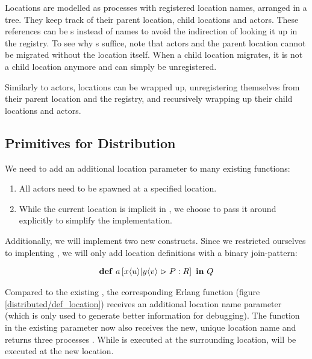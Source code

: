 Locations are modelled as processes with registered location names,
arranged in a tree.
They keep track of their parent location, child locations and actors.
These references can be \PID{}s instead of names
to avoid the indirection of looking it up in the registry.
To see why \PID{}s suffice, note that actors and the parent location
cannot be migrated without the location itself.
When a child location migrates, it is not a child location anymore and can
simply be unregistered.

Similarly to actors, locations can be wrapped up,
unregistering themselves from their parent location and the registry,
and recursively wrapping up their child locations and actors.



\subsection{Primitives for Distribution}

We need to add an additional location parameter to many existing functions:
\begin{enumerate}[nosep]
  \item
    All actors need to be spawned at a specified location.
  \item
    While the current location is implicit in \distjoincalc,
    we choose to pass it around explicitly to simplify the implementation.
\end{enumerate}

Additionally, we will implement two new constructs.
Since we restricted ourselves to implenting \corejoincalc,
we will only add location definitions with a binary join-pattern:

\begin{align*}
  \textbf{\textup{def}} \ a \left[ x\langle u\rangle | y\langle v\rangle \vartriangleright P : R \right] \ \textbf{\textup{in}} \ Q
\end{align*}

Compared to the existing ,
the corresponding Erlang function 
(figure \ref{distributed/def_location})
receives an additional location name parameter
(which is only used to generate better information for debugging).
The function in the existing parameter now also receives the new,
unique location name and returns three processes .
While  is executed at the surrounding location,
 will be executed at the new location.


